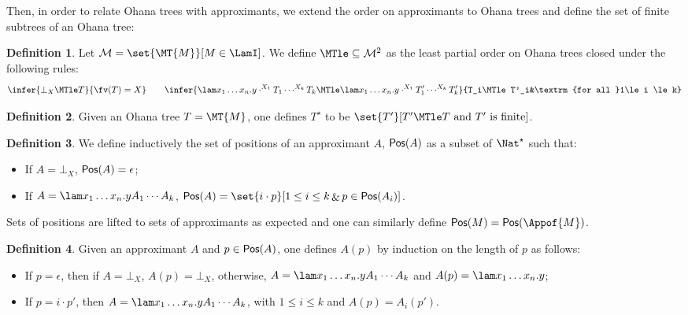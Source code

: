 \documentclass[10pt,a4paper]{amsart}
\newtheorem{theorem}{Theorem}
\theoremstyle{definition}
\newtheorem{definition}[theorem]{Definition}
\providecommand{\cal}{\mathcal}
\begin{document}
Then, in order to relate Ohana trees with approximants, 
we extend the order on approximants to Ohana trees and define 
the set of finite subtrees of an Ohana tree:

\begin{definition} Let ${\cal M}=\set{\MT{M}}[M\in\LamI]$.
	We define $\mathord{\MTle}\subseteq {\cal M}^2$ as 
	the least partial order on Ohana trees closed under the following rules:
	\[
	\infer{\bot_X\MTle T}{\fv(T)=X}\qquad
	\infer{\lam x_1\ldots x_n.y\cdot^{X_1}T_1\cdots^{X_k}T_k
		\MTle \lam x_1\ldots x_n.y\cdot^{X_1}T'_1\cdots^{X_k}T'_k}
		{T_i\MTle T'_i&\textrm{for all }1\le i \le k}
	\]
\end{definition}


\begin{definition}
	Given an Ohana tree $T = \MT{M}$, one defines
	$T^\star$ to be $\set{T'}[T'\MTle T \text{ and $T'$ is finite}]$.
\end{definition}

\newcommand\pos[1]{{\sf Pos}(#1)}

\begin{definition}
	We define inductively the set of positions of an approximant $A$, 
	$\pos{A}$ as a subset of $\Nat^\star$ such that:
	\begin{itemize}
		\item If $A=\bot_X$, $\pos{A}=\epsilon$;
		\item If $A= \lam x_1\ldots x_n.yA_1\cdots A_k$, 
		$\pos{A}=\set{i\cdot p}[1\leq i \leq k \mathop{\&} p\in\pos{A_i}]$.
	\end{itemize}
	Sets of positions are lifted to sets of approximants as expected 
	and one can similarly define $\pos{M} = \pos{\Appof{M}}$. 
\end{definition}

\begin{definition}
	Given an approximant $A$ and $p\in \pos{A}$, one defines 
	$A(p)$ by induction on the length of $p$ as follows:
	\begin{itemize}
		\item If $p=\epsilon$, then if $A=\bot_X$, ${A}(p)=\bot_X$,
		otherwise, $A= \lam x_1\ldots x_n.yA_1\cdots A_k$ and 
		$A(p)=\lam x_1\ldots x_n.y$;
		\item If $p=i\cdot p'$, then $A= \lam x_1\ldots x_n.yA_1\cdots A_k$, 
		with $1\leq i \leq k$ and $A(p)=A_i(p')$.
	\end{itemize}
\end{definition}

\end{document}
